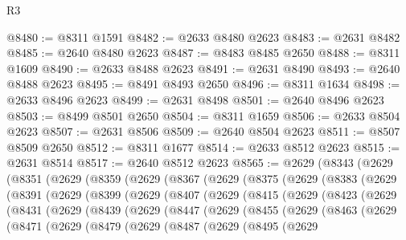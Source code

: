 \begin{lexlean}{R3}
\begin{coremodule}
@8480 := @8311 @1591
@8482 := @2633 @8480 @2623
@8483 := @2631 @8482
@8485 := @2640 @8480 @2623
@8487 := @8483 @8485 @2650
@8488 := @8311 @1609
@8490 := @2633 @8488 @2623
@8491 := @2631 @8490
@8493 := @2640 @8488 @2623
@8495 := @8491 @8493 @2650
@8496 := @8311 @1634
@8498 := @2633 @8496 @2623
@8499 := @2631 @8498
@8501 := @2640 @8496 @2623
@8503 := @8499 @8501 @2650
@8504 := @8311 @1659
@8506 := @2633 @8504 @2623
@8507 := @2631 @8506
@8509 := @2640 @8504 @2623
@8511 := @8507 @8509 @2650
@8512 := @8311 @1677
@8514 := @2633 @8512 @2623
@8515 := @2631 @8514
@8517 := @2640 @8512 @2623
@8565 := @2629
    (@8343
      (@2629
        (@8351
          (@2629
            (@8359
              (@2629
                (@8367
                  (@2629
                    (@8375
                      (@2629
                        (@8383
                          (@2629
                            (@8391
                              (@2629
                                (@8399
                                  (@2629
                                    (@8407
                                      (@2629
                                        (@8415
                                          (@2629
                                            (@8423
                                              (@2629
                                                (@8431
                                                  (@2629
                                                    (@8439
                                                      (@2629
                                                        (@8447
                                                          (@2629
                                                            (@8455
                                                              (@2629
                                                                (@8463
                                                                  (@2629
                                                                    (@8471
                                                                      (@2629
                                                                        (@8479
                                                                          (@2629
                                                                            (@8487
                                                                              (@2629
                                                                                (@8495
                                                                                  (@2629

\end{coremodule}
\end{lexlean}
